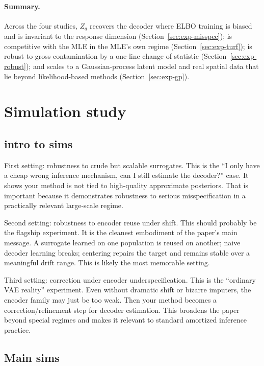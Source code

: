 \documentclass[twoside,11pt]{article}
\begin{document}
\paragraph{Summary.}
Across the four studies, $Z_q$ recovers the decoder where ELBO training is biased and is invariant to the response dimension (Section~\ref{sec:exp-misspec}); is competitive with the MLE in the MLE's own regime (Section~\ref{sec:exp-turf}); is robust to gross contamination by a one-line change of statistic (Section~\ref{sec:exp-robust}); and scales to a Gaussian-process latent model and real spatial data that lie beyond likelihood-based methods (Section~\ref{sec:exp-gp}).

\iffalse  %
%
\section{Simulation study}

\subsection{intro to sims}

First setting: robustness to crude but scalable surrogates.
This is the “I only have a cheap wrong inference mechanism, can I still estimate the decoder?” case. It shows your method is not tied to high-quality approximate posteriors. That is important because it demonstrates robustness to serious misspecification in a practically relevant large-scale regime.

Second setting: robustness to encoder reuse under shift.
This should probably be the flagship experiment. It is the cleanest embodiment of the paper’s main message. A surrogate learned on one population is reused on another; naive decoder learning breaks; centering repairs the target and remains stable over a meaningful drift range. This is likely the most memorable setting.

Third setting: correction under encoder underspecification.
This is the “ordinary VAE reality” experiment. Even without dramatic shift or bizarre imputers, the encoder family may just be too weak. Then your method becomes a correction/refinement step for decoder estimation. This broadens the paper beyond special regimes and makes it relevant to standard amortized inference practice.

\subsection{Main sims}
\label{sec:sims}
\end{document}
